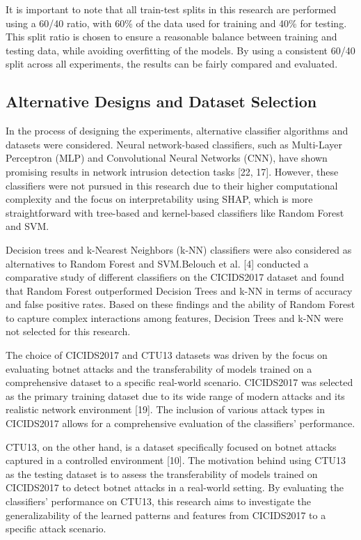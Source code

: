 It is important to note that all train-test splits in this research are performed using a 60/40 ratio, with 60\% of the data used for training and 40\% for testing. This split ratio is chosen to ensure a reasonable balance between training and testing data, while avoiding overfitting of the models. By using a consistent 60/40 split across all experiments, the results can be fairly compared and evaluated.

\subsection{Alternative Designs and Dataset Selection}
In the process of designing the experiments, alternative classifier algorithms and datasets were considered. Neural network-based classifiers, such as Multi-Layer Perceptron (MLP) and Convolutional Neural Networks (CNN), have shown promising results in network intrusion detection tasks [22, 17]. However, these classifiers were not pursued in this research due to their higher computational complexity and the focus on interpretability using SHAP, which is more straightforward with tree-based and kernel-based classifiers like Random Forest and SVM.\@

Decision trees and k-Nearest Neighbors (k-NN) classifiers were also considered as alternatives to Random Forest and SVM.\@ Belouch et al. [4] conducted a comparative study of different classifiers on the CICIDS2017 dataset and found that Random Forest outperformed Decision Trees and k-NN in terms of accuracy and false positive rates. Based on these findings and the ability of Random Forest to capture complex interactions among features, Decision Trees and k-NN were not selected for this research.

The choice of CICIDS2017 and CTU13 datasets was driven by the focus on evaluating botnet attacks and the transferability of models trained on a comprehensive dataset to a specific real-world scenario. CICIDS2017 was selected as the primary training dataset due to its wide range of modern attacks and its realistic network environment [19]. The inclusion of various attack types in CICIDS2017 allows for a comprehensive evaluation of the classifiers' performance.

CTU13, on the other hand, is a dataset specifically focused on botnet attacks captured in a controlled environment [10]. The motivation behind using CTU13 as the testing dataset is to assess the transferability of models trained on CICIDS2017 to detect botnet attacks in a real-world setting. By evaluating the classifiers' performance on CTU13, this research aims to investigate the generalizability of the learned patterns and features from CICIDS2017 to a specific attack scenario.

